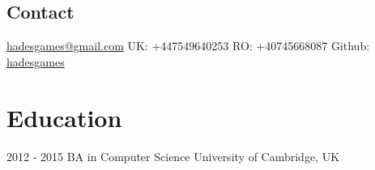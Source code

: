 \documentclass[]{friggeri-cv}
\begin{document}
       {}

\begin{aside}
  \section{Contact}
    \href{mailto:hadesgames@gmail.com}{hadesgames@gmail.com}
    UK: +447549640253
    RO: +40745668087
    Github: \href{http://github.com/hadesgames}{hadesgames}
\end{aside}


\section{Education}

\begin{entrylist}
  \entry
    {2012 - 2015}
    {}
    {BA in Computer Science}
    {}
    {University of Cambridge, UK}
   
\end{entrylist}
\end{document}
